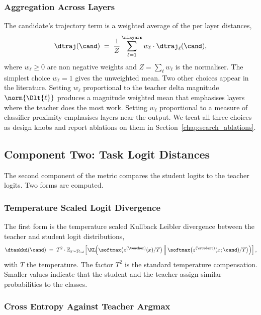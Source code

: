 \subsubsection{Aggregation Across Layers}

The candidate's trajectory term is a weighted average of the per layer distances,
\begin{equation}
\dtraj(\cand) \;=\; \frac{1}{Z} \sum_{\ell=1}^{\nlayers} w_\ell \cdot \dtraj_\ell(\cand),
\label{eq:traj_total}
\end{equation}
where $w_\ell \ge 0$ are non negative weights and $Z = \sum_\ell w_\ell$ is the normaliser. The simplest choice $w_\ell = 1$ gives the unweighted mean. Two other choices appear in the literature. Setting $w_\ell$ proportional to the teacher delta magnitude $\norm{\Dlt{\ell}}$ produces a magnitude weighted mean that emphasises layers where the teacher does the most work. Setting $w_\ell$ proportional to a measure of classifier proximity emphasises layers near the output. We treat all three choices as design knobs and report ablations on them in Section~\ref{chap:search_ablations}.

\subsection{Component Two: Task Logit Distances}

The second component of the metric compares the student logits to the teacher logits. Two forms are computed.

\subsubsection{Temperature Scaled Logit Divergence}

The first form is the temperature scaled Kullback Leibler divergence between the teacher and student logit distributions,
\begin{equation}
\dtaskkd(\cand) \;=\; T^2 \cdot \mathbb{E}_{x \sim \mathcal{D}_{\mathrm{cal}}} \!\left[ \KL\!\Big( \softmax\big(z^{(\teacher)}(x)/T\big) \,\Big\|\, \softmax\big(z^{(\student)}(x; \cand)/T\big) \Big) \right],
\end{equation}
with $T$ the temperature. The factor $T^2$ is the standard temperature compensation. Smaller values indicate that the student and the teacher assign similar probabilities to the classes.

\subsubsection{Cross Entropy Against Teacher Argmax}

